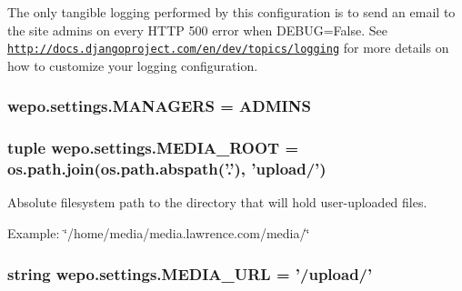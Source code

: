 The only tangible logging performed by this configuration is to send an email to the site admins on every H\-T\-T\-P 500 error when D\-E\-B\-U\-G=False. See \href{http://docs.djangoproject.com/en/dev/topics/logging}{\tt http\-://docs.\-djangoproject.\-com/en/dev/topics/logging} for more details on how to customize your logging configuration. \hypertarget{namespacewepo_1_1settings_a65ccd124bb58f3ba4051c72c6f91a2e2}{
\subsubsection[{M\-A\-N\-A\-G\-E\-R\-S}]{\setlength{\rightskip}{0pt plus 5cm}wepo.\-settings.\-M\-A\-N\-A\-G\-E\-R\-S = {\bf A\-D\-M\-I\-N\-S}}}\label{namespacewepo_1_1settings_a65ccd124bb58f3ba4051c72c6f91a2e2}
\hypertarget{namespacewepo_1_1settings_aebf1042bc00e28af6a9d930633df0074}{
\subsubsection[{M\-E\-D\-I\-A\-\_\-\-R\-O\-O\-T}]{\setlength{\rightskip}{0pt plus 5cm}tuple wepo.\-settings.\-M\-E\-D\-I\-A\-\_\-\-R\-O\-O\-T = os.\-path.\-join(os.\-path.\-abspath('.'), 'upload/')}}\label{namespacewepo_1_1settings_aebf1042bc00e28af6a9d930633df0074}


Absolute filesystem path to the directory that will hold user-\/uploaded files. 

Example\-: \char`\"{}/home/media/media.\-lawrence.\-com/media/\char`\"{} \hypertarget{namespacewepo_1_1settings_a1b1c9434ae3bae0fbf31d4b5da6fed8e}{
\subsubsection[{M\-E\-D\-I\-A\-\_\-\-U\-R\-L}]{\setlength{\rightskip}{0pt plus 5cm}string wepo.\-settings.\-M\-E\-D\-I\-A\-\_\-\-U\-R\-L = '/upload/'}}\label{namespacewepo_1_1settings_a1b1c9434ae3bae0fbf31d4b5da6fed8e}


